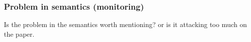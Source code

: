 

\subsubsection*{Problem in semantics (monitoring)}
Is the problem in the semantics worth mentioning? or is it attacking too much on the paper.
